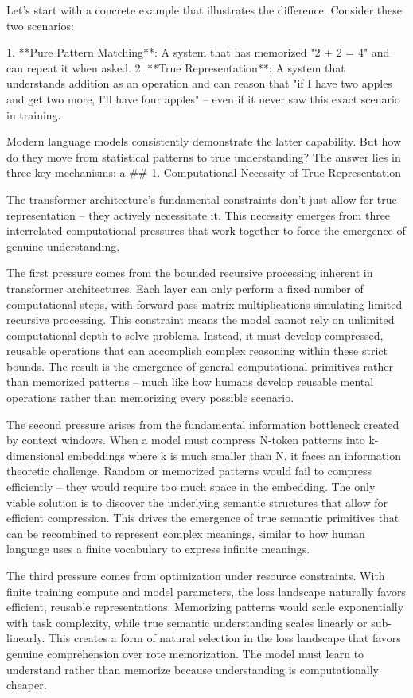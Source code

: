 Let's start with a concrete example that illustrates the difference. Consider these two scenarios:

1. **Pure Pattern Matching**: A system that has memorized "2 + 2 = 4" and can repeat it when asked.
2. **True Representation**: A system that understands addition as an operation and can reason that "if I have two apples and get two more, I'll have four apples" – even if it never saw this exact scenario in training.

Modern language models consistently demonstrate the latter capability. But how do they move from statistical patterns to true understanding? The answer lies in three key mechanisms:
a
## 1. Computational Necessity of True Representation

The transformer architecture's fundamental constraints don't just allow for true representation – they actively necessitate it. This necessity emerges from three interrelated computational pressures that work together to force the emergence of genuine understanding.

The first pressure comes from the bounded recursive processing inherent in transformer architectures. Each layer can only perform a fixed number of computational steps, with forward pass matrix multiplications simulating limited recursive processing. This constraint means the model cannot rely on unlimited computational depth to solve problems. Instead, it must develop compressed, reusable operations that can accomplish complex reasoning within these strict bounds. The result is the emergence of general computational primitives rather than memorized patterns – much like how humans develop reusable mental operations rather than memorizing every possible scenario.

The second pressure arises from the fundamental information bottleneck created by context windows. When a model must compress N-token patterns into k-dimensional embeddings where k is much smaller than N, it faces an information theoretic challenge. Random or memorized patterns would fail to compress efficiently – they would require too much space in the embedding. The only viable solution is to discover the underlying semantic structures that allow for efficient compression. This drives the emergence of true semantic primitives that can be recombined to represent complex meanings, similar to how human language uses a finite vocabulary to express infinite meanings.

The third pressure comes from optimization under resource constraints. With finite training compute and model parameters, the loss landscape naturally favors efficient, reusable representations. Memorizing patterns would scale exponentially with task complexity, while true semantic understanding scales linearly or sub-linearly. This creates a form of natural selection in the loss landscape that favors genuine comprehension over rote memorization. The model must learn to understand rather than memorize because understanding is computationally cheaper.


